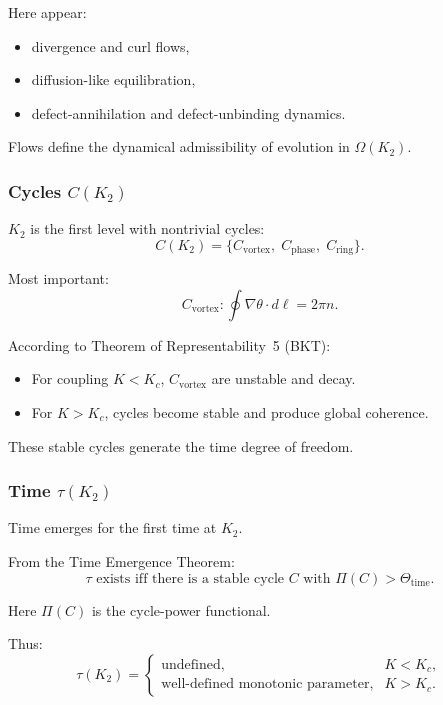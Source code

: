Here appear:
\begin{itemize}
    \item divergence and curl flows,
    \item diffusion-like equilibration,
    \item defect-annihilation and defect-unbinding dynamics.
\end{itemize}

Flows define the dynamical admissibility of evolution in $\Omega(K_2)$.

\subsubsection{Cycles \texorpdfstring{$C(K_2)$}{C(K_2)}}

$K_2$ is the first level with nontrivial cycles:
\[
C(K_2) = \{C_{\mathrm{vortex}},\; C_{\mathrm{phase}},\; C_{\mathrm{ring}}\}.
\]

Most important:
\[
C_{\mathrm{vortex}}: \oint \nabla \theta \cdot d\ell = 2\pi n.
\]

According to Theorem of Representability~5 (BKT):
\begin{itemize}
    \item For coupling $K < K_c$, $C_{\mathrm{vortex}}$ are unstable and
          decay.
    \item For $K > K_c$, cycles become stable and produce global
          coherence.
\end{itemize}

These stable cycles generate the time degree of freedom.

\subsubsection{Time \texorpdfstring{$\tau(K_2)$}{\tau(K_2)}}

Time emerges for the first time at $K_2$.

From the Time Emergence Theorem:
\[
\tau \text{ exists iff there is a stable cycle } 
C \text{ with } \Pi(C) > \Theta_{\mathrm{time}}.
\]

Here $\Pi(C)$ is the cycle-power functional.

Thus:
\[
\tau(K_2) =
\begin{cases}
\text{undefined}, & K < K_c, \\
\text{well-defined monotonic parameter}, & K > K_c.
\end{cases}
\]

